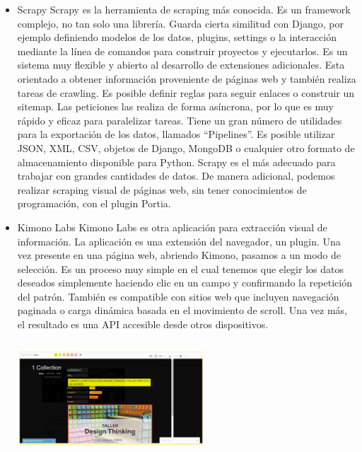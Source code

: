 \documentclass[twoside,twocolumn]{article}
\begin{document}
\begin{itemize}
\item Scrapy
\newline
Scrapy es la herramienta de scraping más conocida. Es un framework complejo, no tan solo una librería. Guarda cierta similitud con Django, por ejemplo definiendo modelos de los datos, plugins, settings o la interacción mediante la línea de comandos para construir proyectos y ejecutarlos. Es un sistema muy flexible y abierto al desarrollo de extensiones adicionales.
\newline
Esta orientado a obtener información proveniente de páginas web y también realiza tareas de crawling. Es posible definir reglas para seguir enlaces o construir un sitemap. Las peticiones las realiza de forma asíncrona, por lo que es muy rápido y eficaz para paralelizar tareas. Tiene un gran número de utilidades para la exportación de los datos, llamados “Pipelines”. Es posible utilizar JSON, XML, CSV, objetos de Django, MongoDB o cualquier otro formato de almacenamiento disponible para Python. Scrapy es el más adecuado para trabajar con grandes cantidades de datos.
\newline
De manera adicional, podemos realizar scraping visual de páginas web, sin tener conocimientos de programación, con el plugin Portia.
\newline
\item 	Kimono Labs
\newline
Kimono Labs es otra aplicación para extracción visual de información. La aplicación es una extensión del navegador, un plugin. Una vez presente en una página web, abriendo Kimono, pasamos a un modo de selección. Es un proceso muy simple en el cual tenemos que elegir los datos deseados simplemente haciendo clic en un campo y confirmando la repetición del patrón.
\newline
También es compatible con sitios web que incluyen navegación paginada o carga dinámica basada en el movimiento de scroll. Una vez más, el resultado es una API accesible desde otros dispositivos.  
\newline
\includegraphics[width=7cm, height=5cm]{Image/bdimages.png}

\end{itemize}
\end{document}
